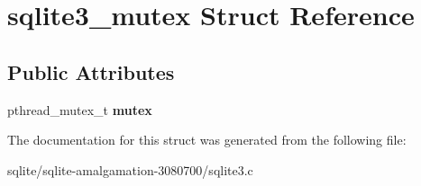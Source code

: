 \hypertarget{structsqlite3__mutex}{\section{sqlite3\+\_\+mutex Struct Reference}
\label{structsqlite3__mutex}
}
\subsection*{Public Attributes}
\begin{DoxyCompactItemize}
\item 
\hypertarget{structsqlite3__mutex_a6eef25bee73a3640dbbd052d707dbfdc}{pthread\+\_\+mutex\+\_\+t {\bfseries mutex}}\label{structsqlite3__mutex_a6eef25bee73a3640dbbd052d707dbfdc}

\end{DoxyCompactItemize}


The documentation for this struct was generated from the following file\+:\begin{DoxyCompactItemize}
\item 
sqlite/sqlite-\/amalgamation-\/3080700/sqlite3.\+c\end{DoxyCompactItemize}
